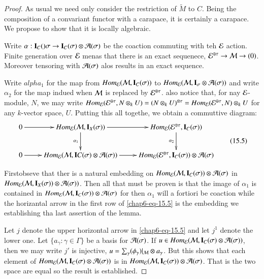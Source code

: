 \begin{proof}
As usual we need only consider the restriction of $\widetilde{M}$ to $C$. Being the composition of a convariant functor with a carapace, it is certainly a carapace. We propose to show that it is locally algebraic.

Write $\alpha : \mathbf{I}_{C}()\sigma \rightarrow \mathbf{I}_{C}(\sigma)\otimes \mathcal{A}(\sigma)$ be the coaction commuting with teh $\mathcal{E}$ action. Finite generation over $\mathcal{E}$ menas that there is an exact sequenece, $\mathcal{E}^{\oplus \tau}\rightarrow \mathcal{M} \rightarrow (0)$. Moreover tensoring with $\mathcal{A}(\sigma)$ alos results in an exact sequence.

Write $alpha_{1}$ for the map from $Hom_{\mathcal{E}}(\mathcal{M}, \mathbf{I}_{C}(\sigma))$ to $Hom_{\mathcal{E}}(\mathcal{M}, \mathbf{I}_{\sigma} \otimes \mathcal{A} (\sigma))$ and write $\alpha_{2}$ for the map indued when $\mathcal{M}$ is replaced by $\mathcal{E}^{\oplus \tau}$. also notice that, for nay $\mathcal{E}$-module, $N$, we may write $Hom_{\mathcal{E}}(\mathcal{E}^{\oplus \tau}, N \otimes_{k} U) = (N \otimes_{k} U)^{\otimes \tau} = Hom_{\mathcal{E}}(\mathcal{E}^{\oplus \tau}, N)\otimes_{k} U$ for any $k$-vector space, $U$. Putting this all togethe, we obtain a commuttive diagram:
\begin{equation*}\label{chap6-eq-15.5}
\vcenter{
\xymatrix{
0 \ar[r] & Hom_{\calE}(\calM, \bI_{X}(\sigma))\ar[d]_-{\alpha_{1}} \ar[r]& Hom_{\calE}(\calE^{\oplus \tau}, \bI_{C}(\sigma))\ar[d]_-{\alpha_{2}}\\
0 \ar[r] & Hom_{\calE}(\calM, \bI{C}(\sigma) \otimes \calA(\sigma)) \ar[r] & Hom_{\calE}(\calE^{\oplus \tau}, \bI_{C}(\sigma)) \otimes \calA(\sigma)
}}\tag{15.5}
\end{equation*}

 First\pageoriginale obseve that ther is a natural embedding on $Hom_{\mathcal{E}}(\mathcal{M}, \mathbf{I}_{C}(\sigma)) \otimes \mathcal{A}(\sigma)$ in $Hom_{\mathcal{E}}(\mathcal{M}, \mathbf{I}_{X}(\sigma))\otimes \mathcal{A}(\sigma))$. Then all that must be proven is that the image of $\alpha_{1}$ is contained in $Hom_{\mathcal{E}}(\mathcal{M}, \mathbf{I}_{C}(\sigma)) \otimes \mathcal{A}(\sigma)$ for then $\alpha_{1}$ will a fortiori be coaction while the horizantal arrow in the first row of \ref{chap6-eq-15.5} is the embedding we establishing tha last assertion of the lemma.

 Let $j$ denote the upper horizontal arrow in \ref{chap6-eq-15.5} and let $j^{1}$ denote the lower one. Let $\{a_{\gamma}: \gamma \in \Gamma\}$ be a basis for $\mathcal{A}(\sigma)$. If $u \in Hom_{\mathcal{E}}(\mathcal{M}, \mathbf{I}_{C}(\sigma) \otimes \mathcal{A}(\sigma))$, then we may write $j'$ is injective, $u = \sum_{\gamma}(\phi_{\gamma})|_{\mathcal{M}} \otimes a_{\gamma}$. But this shows that each element of $Hom_{\mathcal{E}}(\mathcal{M}, \mathbf{I}_{C}(\sigma) \otimes \mathcal{A}(\sigma))$ is in $Hom_{\calE}(\calM, \bI_{C}\break (\sigma)) \otimes \calA(\sigma)$. That is the two space are equal so the result is established.
 \end{proof}

